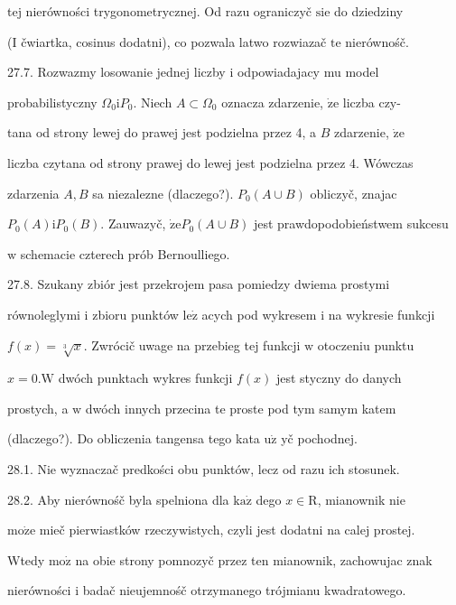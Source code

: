 \documentclass[a4paper,12pt]{article}
\begin{document}
tej nierówności trygonometrycznej. Od razu ograniczyč $\mathrm{s}\mathrm{i}\mathrm{e}$ do dziedziny

(I čwiartka, cosinus dodatni), co pozwala latwo rozwiazač $\mathrm{t}\mathrm{e}$ nierównośč.

27.7. Rozwazmy losowanie jednej liczby $\mathrm{i}$ odpowiadajacy mu model

probabilistyczny $\Omega_{0} \mathrm{i}P_{0}$. Niech $ A\subset \Omega_{0}$ oznacza zdarzenie, $\dot{\mathrm{z}}\mathrm{e}$ liczba czy-

tana od strony lewej do prawej jest podzielna przez 4, a $B$ zdarzenie, $\dot{\mathrm{z}}\mathrm{e}$

liczba czytana od strony prawej do lewej jest podzielna przez 4. Wówczas

zdarzenia $A, B$ sa niezalezne (dlaczego?). $P_{0}(A\cup B)$ obliczyč, znajac

$P_{0}(A)\mathrm{i}P_{0}(B)$. Zauwazyč, $\dot{\mathrm{z}}\mathrm{e}P_{0}(A\cup B)$ jest prawdopodobieństwem sukcesu

$\mathrm{w}$ schemacie czterech prób Bernoulliego.

27.8. Szukany zbiór jest przekrojem pasa pomiedzy dwiema prostymi

równoleglymi $\mathrm{i}$ zbioru punktów $\mathrm{l}\mathrm{e}\dot{\mathrm{z}}$ acych pod wykresem $\mathrm{i}$ na wykresie funkcji

$f(x) = \sqrt[3]{x}$. Zwrócič uwage na przebieg tej funkcji $\mathrm{w}$ otoczeniu punktu

$x = 0. \mathrm{W}$ dwóch punktach wykres funkcji $f(x)$ jest styczny do danych

prostych, a $\mathrm{w}$ dwóch innych przecina te proste pod tym samym katem

(dlaczego?). Do obliczenia tangensa tego kata $\mathrm{u}\dot{\mathrm{z}}$ yč pochodnej.

28.1. Nie wyznaczač predkości obu punktów, lecz od razu ich stosunek.

28.2. Aby nierównośč byla spelniona dla $\mathrm{k}\mathrm{a}\dot{\mathrm{z}}$ dego $x\in \mathrm{R}$, mianownik nie

$\mathrm{m}\mathrm{o}\dot{\mathrm{z}}\mathrm{e}$ mieč pierwiastków rzeczywistych, czyli jest dodatni na calej prostej.

Wtedy $\mathrm{m}\mathrm{o}\dot{\mathrm{z}}$ na obie strony pomnozyč przez ten mianownik, zachowujac znak

nierówności $\mathrm{i}$ badač nieujemnośč otrzymanego trójmianu kwadratowego.
\end{document}
